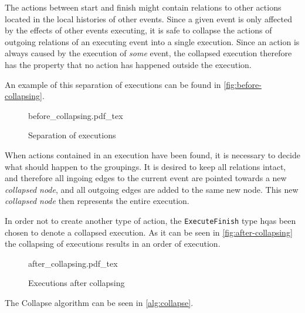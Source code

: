 	The actions between start and finish might contain relations to other actions located in the local histories of other events. Since a given event is only affected by the effects of other events executing, it is safe to collapse the actions of outgoing relations of an executing event into a single execution. Since an action is always caused by the execution of \textit{some} event, the collapsed execution therefore has the property that no action has happened outside the execution.
	
	An example of this separation of executions can be found in \autoref{fig:before-collapsing}.
	
	\begin{figure}
		\centering
		\def\svgwidth{0.42\columnwidth}
		\fontsize{6}{8}\selectfont
		{before_collapsing.pdf_tex}
		\caption{Separation of executions}
		\label{fig:before-collapsing}
	\end{figure}
	
	\newpar When actions contained in an execution have been found, it is necessary to decide what should happen to the groupings. It is desired to keep all relations intact, and therefore all ingoing edges to the current event are pointed towards a new \textit{collapsed node}, and all outgoing edges are added to the same new node. This new \textit{collapsed node} then represents the entire execution. 
	
	In order not to create another type of action, the \texttt{ExecuteFinish} type hqas been chosen to denote a collapsed execution. As it can be seen in \autoref{fig:after-collapsing} the collapsing of executions results in an order of execution.
	
	\begin{figure}
		\centering
		\def\svgwidth{0.22\columnwidth}
		\fontsize{6}{8}\selectfont
		{after_collapsing.pdf_tex}
		\caption{Executions after collapsing}
		\label{fig:after-collapsing}
	\end{figure}
	
	The Collapse algorithm can be seen in \autoref{alg:collapse}.
	
